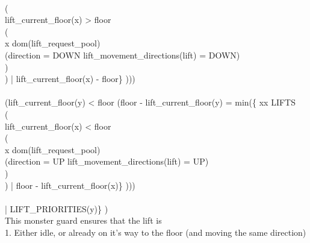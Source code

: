 \documentclass[10pt,a4paper]{report}
\begin{document}
\begin{description}
\begin{description}
\begin{description}
{		\\\hspace*{1.6 cm}  (
		\\\hspace*{2 cm}  lift\_current\_floor(x) >  floor \land 
		\\\hspace*{2 cm}  (
		\\\hspace*{2.4 cm}  x \notin  dom(lift\_request\_pool) \lor 
		\\\hspace*{2.4 cm}  (direction = DOWN \land  lift\_movement\_directions(lift) = DOWN)
		\\\hspace*{2 cm}  )
		\\\hspace*{1.6 cm}  ) |  lift\_current\_floor(x) -  floor\} ))) \land 
		\\\hspace*{1.2 cm}  
		\\\hspace*{1.6 cm}  (lift\_current\_floor(y) <  floor \limp  (floor -  lift\_current\_floor(y) = min(\{ x\qdot x \in  LIFTS \land 
		\\\hspace*{1.6 cm}  (
		\\\hspace*{2 cm}  lift\_current\_floor(x) <  floor \land 
		\\\hspace*{2 cm}  (
		\\\hspace*{2.4 cm}  x \notin  dom(lift\_request\_pool) \lor 
		\\\hspace*{2.4 cm}  (direction = UP \land  lift\_movement\_directions(lift) = UP)
		\\\hspace*{2 cm}  )
		\\\hspace*{1.6 cm}  ) |  floor -  lift\_current\_floor(x)\} )))
		\\\hspace*{1.2 cm}  
		\\\hspace*{1.2 cm}  |  LIFT\_PRIORITIES(y)\} ) }{		\\\hspace*{1.4 cm}  This monster guard ensures that the lift is
		\\\hspace*{1.2 cm}  1. Either idle, or already on it's way to the floor (and moving the same direction)
}
\end{description}
\end{description}
\end{description}
\end{document}
